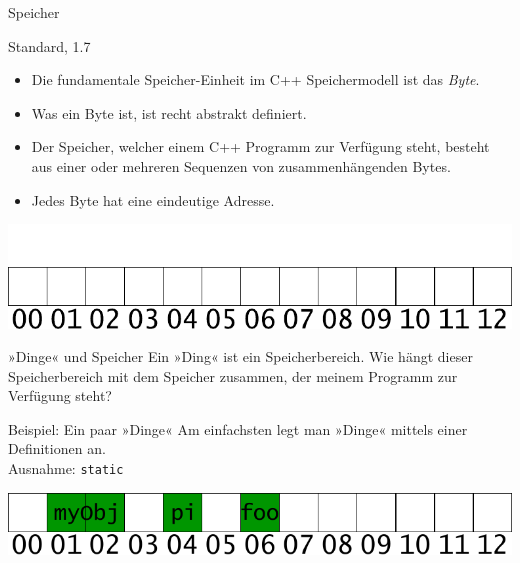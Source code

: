 \begin{frame}{Speicher}
	\begin{block}{Standard, 1.7}
		\begin{itemize}[<+->]
			\item Die fundamentale Speicher-Einheit im C++ Speichermodell ist das \emph{Byte}.
			\item Was ein Byte ist, ist recht abstrakt definiert.
			\item Der Speicher, welcher einem C++ Programm zur Verfügung steht, besteht aus einer oder mehreren Sequenzen von zusammenhängenden Bytes.
			\item Jedes Byte hat eine eindeutige Adresse.
		\end{itemize}
	\end{block}
	
	\uncover<+->
	{
		\includegraphics[width=\linewidth]{images/free}
	}
\end{frame}

\begin{frame}[fragile]{»Dinge« und Speicher}
	Ein »Ding« ist ein Speicherbereich. Wie hängt dieser Speicherbereich mit dem Speicher zusammen, der meinem Programm zur Verfügung steht?\\
	
	\pause
	
	\begin{block}{Beispiel: Ein paar »Dinge«}
		Am einfachsten legt man »Dinge« mittels einer  Definitionen an.\\
		{\tiny Ausnahme: \verb|static|}
		
		{\footnotesize
		\begin{block}{}
			
		\end{block}
		}
		
		\pause
		
		\includegraphics[width=\linewidth]{images/object_things}
	\end{block}
\end{frame}


